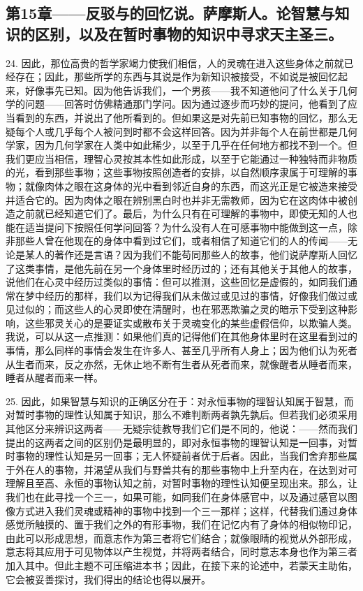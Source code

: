 
\subsection{第15章——反驳与的回忆说。萨摩斯人。论智慧与知识的区别，以及在暂时事物的知识中寻求天主圣三。}

24. 因此，那位高贵的哲学家竭力使我们相信，人的灵魂在进入这些身体之前就已经存在；因此，那些所学的东西与其说是作为新知识被接受，不如说是被回忆起来，好像事先已知。因为他告诉我们，一个男孩——我不知道他问了什么关于几何学的问题——回答时仿佛精通那门学问。因为通过逐步而巧妙的提问，他看到了应当看到的东西，并说出了他所看到的。但如果这是对先前已知事物的回忆，那么无疑每个人或几乎每个人被问到时都不会这样回答。因为并非每个人在前世都是几何学家，因为几何学家在人类中如此稀少，以至于几乎在任何地方都找不到一个。但我们更应当相信，理智心灵按其本性如此形成，以至于它能通过一种独特而非物质的光，看到那些事物；这些事物按照创造者的安排，以自然顺序隶属于可理解的事物；就像肉体之眼在这身体的光中看到邻近自身的东西，而这光正是它被造来接受并适合它的。因为肉体之眼在辨别黑白时也并非无需教师，因为它在这肉体中被创造之前就已经知道它们了。最后，为什么只有在可理解的事物中，即使无知的人也能在适当提问下按照任何学问回答？为什么没有人在可感事物中能做到这一点，除非那些人曾在他现在的身体中看到过它们，或者相信了知道它们的人的传闻——无论是某人的著作还是言语？因为我们不能苟同那些人的故事，他们说萨摩斯人回忆了这类事情，是他先前在另一个身体里时经历过的；还有其他关于其他人的故事，说他们在心灵中经历过类似的事情：但可以推测，这些回忆是虚假的，如同我们通常在梦中经历的那样，我们以为记得我们从未做过或见过的事情，好像我们做过或见过似的；而这些人的心灵即使在清醒时，也在邪恶欺骗之灵的暗示下受到这种影响，这些邪灵关心的是要证实或散布关于灵魂变化的某些虚假信仰，以欺骗人类。我说，可以从这一点推测：如果他们真的记得他们在其他身体里时在这里看到过的事情，那么同样的事情会发生在许多人、甚至几乎所有人身上；因为他们认为死者从生者而来，反之亦然，无休止地不断有生者从死者而来，就像醒者从睡者而来，睡者从醒者而来一样。\par

25. 因此，如果智慧与知识的正确区分在于：对永恒事物的理智认知属于智慧，而对暂时事物的理性认知属于知识，那么不难判断两者孰先孰后。但若我们必须采用其他区分来辨识这两者——无疑宗徒教导我们它们是不同的，他说：——然而我们提出的这两者之间的区别仍是最明显的，即对永恒事物的理智认知是一回事，对暂时事物的理性认知是另一回事；无人怀疑前者优于后者。因此，当我们舍弃那些属于外在人的事物，并渴望从我们与野兽共有的那些事物中上升至内在，在达到对可理解且至高、永恒的事物认知之前，对暂时事物的理性认知便呈现出来。那么，让我们也在此寻找一个三一，如果可能，如同我们在身体感官中，以及通过感官以图像方式进入我们灵魂或精神的事物中找到一个三一那样；这样，代替我们通过身体感觉所触摸的、置于我们之外的有形事物，我们在记忆内有了身体的相似物印记，由此可以形成思想，而意志作为第三者将它们结合；就像眼睛的视觉从外部形成，意志将其应用于可见物体以产生视觉，并将两者结合，同时意志本身也作为第三者加入其中。但此主题不可压缩进本书；因此，在接下来的论述中，若蒙天主助佑，它会被妥善探讨，我们得出的结论也得以展开。\par

